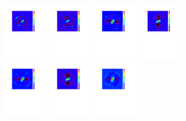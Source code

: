 \documentclass[a4paper]{article}
\begin{document}
\begin{figure}
\includegraphics[height=3cm, trim=2cm 13cm 4cm 2cm, clip=true]{Figure/map_1mm_scan20121124s0112}
\includegraphics[height=3cm, trim=2cm 13cm 4cm 2cm, clip=true]{Figure/map_1mm_scan20121124s0113}
\includegraphics[height=3cm, trim=2cm 13cm 4cm 2cm, clip=true]{Figure/map_2mm_scan20121124s0104}
\includegraphics[height=3cm, trim=2cm 13cm 4cm 2cm, clip=true]{Figure/map_2mm_scan20121124s0105}
\includegraphics[height=3cm, trim=2cm 13cm 4cm 2cm, clip=true]{Figure/map_2mm_scan20121124s0107}
\includegraphics[height=3cm, trim=2cm 13cm 4cm 2cm, clip=true]{Figure/map_2mm_scan20121124s0108}
\includegraphics[height=3cm, trim=2cm 13cm 4cm 2cm, clip=true]{Figure/map_2mm_scan20121124s0109}

\end{figure}
\end{document}

